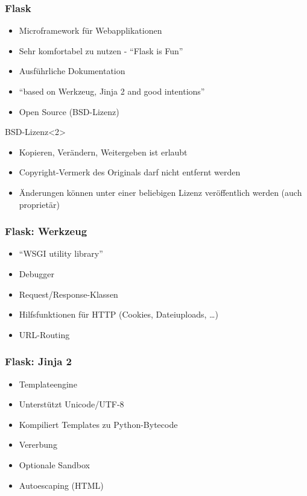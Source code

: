 \documentclass{beamer}
\begin{document}
\begin{frame}
  \frametitle{Flask}
  \begin{itemize}
    \item Microframework für Webapplikationen
    \item Sehr komfortabel zu nutzen - \enquote{Flask is Fun}
    \item Ausführliche Dokumentation
    \item \enquote{based on Werkzeug, Jinja 2 and good intentions}
    \item Open Source (BSD-Lizenz)
  \end{itemize}

  \begin{block}{BSD-Lizenz}<2>
    \begin{itemize}
      \item Kopieren, Verändern, Weitergeben ist erlaubt
      \item Copyright-Vermerk des Originals darf nicht entfernt werden
      \item Änderungen können unter einer beliebigen Lizenz veröffentlich werden (auch proprietär)
    \end{itemize}
  \end{block}
\end{frame}

\begin{frame}
  \frametitle{Flask: Werkzeug}
  \begin{itemize}
    \item \enquote{WSGI utility library}
    \item Debugger
    \item Request/Response-Klassen
    \item Hilfsfunktionen für HTTP (Cookies, Dateiuploads, \ldots)
    \item URL-Routing
  \end{itemize}
\end{frame}

\begin{frame}
  \frametitle{Flask: Jinja 2}
  \begin{itemize}
    \item Templateengine
    \item Unterstützt Unicode/UTF-8
    \item Kompiliert Templates zu Python-Bytecode
    \item Vererbung
    \item Optionale Sandbox
    \item Autoescaping (HTML)
  \end{itemize}
\end{frame}
\end{document}
